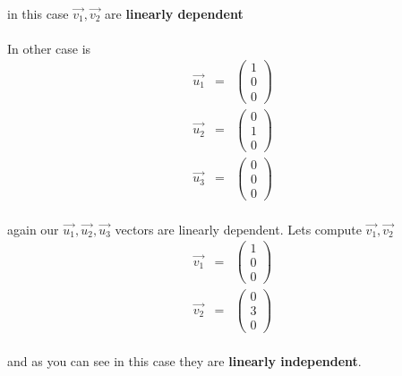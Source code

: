 \documentclass[11pt]{article}
\begin{document}
\paragraph{}in this case $\vec{v_1}, \vec{v_2}$ are \textbf{linearly dependent}
\paragraph{}In other case is 
\begin{eqnarray*}
\vec{u_1}
&=&
\begin{pmatrix}
1\\
0\\
0
\end{pmatrix}\\
\vec{u_2}
&=&
\begin{pmatrix}
0\\
1\\
0
\end{pmatrix}\\
\vec{u_3}
&=&
\begin{pmatrix}
0\\
0\\
0
\end{pmatrix}
\end{eqnarray*}
\paragraph{}again our $\vec{u_1},\vec{u_2},\vec{u_3}$ vectors are linearly dependent. Lets compute $\vec{v_1}, \vec{v_2}$
\begin{eqnarray*}
\vec{v_1}
&=&
\begin{pmatrix}
1\\
0\\
0
\end{pmatrix}\\
\vec{v_2}
&=&
\begin{pmatrix}
0\\
3\\
0
\end{pmatrix}
\end{eqnarray*}
\paragraph{}and as you can see in this case they are \textbf{linearly independent}. 
\end{document}
